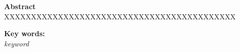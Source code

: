 \textbf{Abstract}\\
XXXXXXXXXXXXXXXXXXXXXXXXXXXXXXXXXXXXXXXXXXX

\textbf{Key words:}\\
\textbullet \textit{ keyword}
